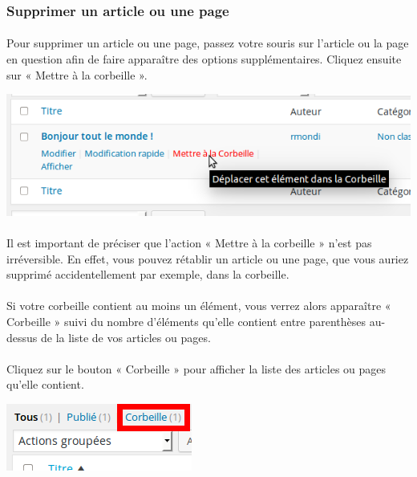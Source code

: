 \documentclass[10pt,a4paper]{article}
\begin{document}
\subsubsection{Supprimer un article ou une page}
\paragraph{}Pour supprimer un article ou une page, passez votre souris sur l'article ou la page en question afin de faire apparaître des options supplémentaires. Cliquez ensuite sur « Mettre à la corbeille ».
\begin{center}
\includegraphics[scale=0.35]{img/0068.png}
\end{center}
\paragraph{}Il est important de préciser que l'action « Mettre à la corbeille » n'est pas irréversible. En effet, vous pouvez rétablir un article ou une page, que vous auriez supprimé accidentellement par exemple, dans la corbeille.
\paragraph{}Si votre corbeille contient au moins un élément, vous verrez alors apparaître « Corbeille » suivi du nombre d'éléments qu'elle contient entre parenthèses au-dessus de la liste de vos articles ou pages.
\paragraph{}Cliquez sur le bouton « Corbeille » pour afficher la liste des articles ou pages qu'elle contient.
\begin{center}
\includegraphics[scale=0.35]{img/0069.png}
\end{center}
\end{document}
